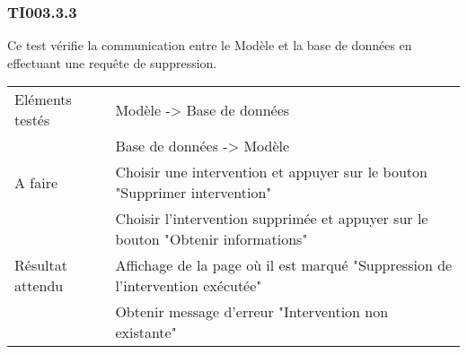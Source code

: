   		
  	\subsubsection{TI003.3.3}
  		Ce test vérifie la communication entre le Modèle et la base de données en effectuant une requête de suppression.
  		\begin{center}
    	 		\begin{tabular}[h]{|p{}|p{}|}
			\hline
				Eléments testés & Modèle -> Base de données  \\
							    &  Base de données -> Modèle \\\hline
    				A faire & Choisir une intervention et appuyer sur le bouton "Supprimer intervention" \\
    						& Choisir l'intervention supprimée et appuyer sur le bouton "Obtenir informations" \\\hline
    				Résultat attendu & Affichage de la page où il est marqué "Suppression de l'intervention exécutée" \\  								 & Obtenir message d'erreur "Intervention non existante" \\\hline
     		\end{tabular}
  		\end{center}	
  	
  		